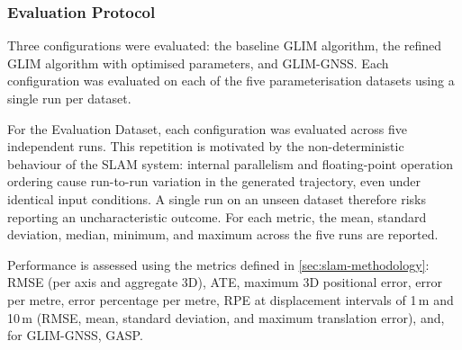 \subsubsection{Evaluation Protocol}

Three configurations were evaluated: the baseline GLIM algorithm, the refined GLIM algorithm with optimised parameters, and GLIM-GNSS. Each configuration was evaluated on each of the five parameterisation datasets using a single run per dataset.

For the Evaluation Dataset, each configuration was evaluated across five independent runs. This repetition is motivated by the non-deterministic behaviour of the SLAM system: internal parallelism and floating-point operation ordering cause run-to-run variation in the generated trajectory, even under identical input conditions. A single run on an unseen dataset therefore risks reporting an uncharacteristic outcome. For each metric, the mean, standard deviation, median, minimum, and maximum across the five runs are reported.

Performance is assessed using the metrics defined in \cref{sec:slam-methodology}: RMSE (per axis and aggregate 3D), ATE, maximum 3D positional error, error per metre, error percentage per metre, RPE at displacement intervals of 1\,m and 10\,m (RMSE, mean, standard deviation, and maximum translation error), and, for GLIM-GNSS, GASP.

